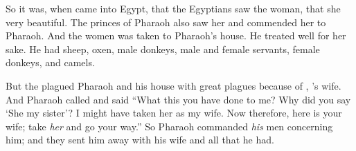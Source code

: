 \bverse So it was, when  came into Egypt, that the Egyptians saw the woman, that she \was very beautiful.
\bverse The princes of Pharaoh also saw her and commended her to Pharaoh. And the women was taken to Pharaoh's house.
\bverse He treated  well for her sake. He had sheep, oxen, male donkeys, male and female servants, female donkeys, and camels.

\bverse But the \lord plagued Pharaoh and his house with great plagues because of , 's wife.
\bverse And Pharaoh called  and said ``What \is this you have done to me? Why did you say `She \is my sister'? I might have taken her as my wife. Now therefore, here is your wife; take \textit{her} and go your way.''
\bverse So Pharaoh commanded \textit{his} men concerning him; and they sent him away with his wife and all that he had.